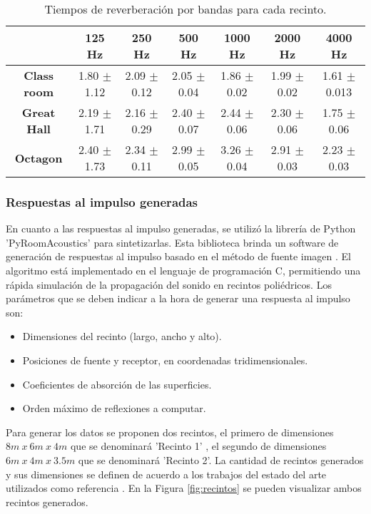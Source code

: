 \begin{table}[H]
\centering{}
\caption{Tiempos de reverberación por bandas para cada recinto.}
\begin{adjustbox}{max width=\textwidth}
\begin{tabular}{|c|c|c|c|c|c|c|}
\hline
                    & \textbf{125 Hz} & \textbf{250 Hz} & \textbf{500 Hz} & \textbf{1000 Hz} & \textbf{2000 Hz} & \textbf{4000 Hz} \\ \hline
\textbf{Class room} & 1.80 $\pm$ 1.12 & 2.09 $\pm$ 0.12 & 2.05 $\pm$ 0.04 & 1.86 $\pm$ 0.02  & 1.99 $\pm$ 0.02  & 1.61 $\pm$ 0.013 \\ \hline
\textbf{Great Hall} & 2.19 $\pm$ 1.71 & 2.16 $\pm$ 0.29 & 2.40 $\pm$ 0.07 & 2.44 $\pm$ 0.06  & 2.30 $\pm$ 0.06  & 1.75 $\pm$ 0.06  \\ \hline
\textbf{Octagon}    & 2.40 $\pm$ 1.73 & 2.34 $\pm$ 0.11 & 2.99 $\pm$ 0.05 & 3.26 $\pm$ 0.04  & 2.91 $\pm$ 0.03  & 2.23 $\pm$ 0.03  \\ \hline
\end{tabular}
\end{adjustbox}
\label{table:trs_recintos}
\end{table}


\subsubsection{Respuestas al impulso generadas}

En cuanto a las respuestas al impulso generadas, se utilizó la librería de Python 'PyRoomAcoustics' \cite{pyroom} para sintetizarlas. Esta biblioteca brinda un software de generación de respuestas al impulso basado en el método de fuente imagen  \cite{ISM}. El algoritmo está implementado en el lenguaje de programación C, permitiendo una rápida simulación de la propagación del sonido en recintos poliédricos. Los parámetros que se deben indicar a la hora de generar una respuesta al impulso son: 

\begin{itemize}
\item Dimensiones del recinto (largo, ancho y alto).
\item Posiciones de fuente y receptor, en coordenadas tridimensionales.
\item Coeficientes de absorción de las superficies.
\item Orden máximo de reflexiones a computar.
\end{itemize} 

Para generar los datos se proponen dos recintos, el primero de dimensiones $8m\: x\: 6m\: x\: 4m$ que se denominará 'Recinto 1' , el segundo de dimensiones $6m\: x\: 4m\: x\: 3.5m$ que se denominará 'Recinto 2'. La cantidad de recintos generados y sus dimensiones se definen de acuerdo a los trabajos del estado del arte utilizados como referencia \cite{rir_filtinverso, FCN}.  En la Figura \ref{fig:recintos} se pueden visualizar ambos recintos generados. 


